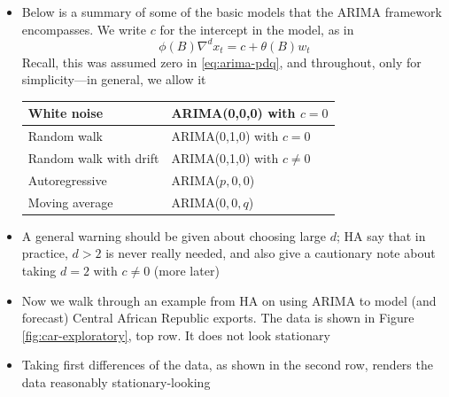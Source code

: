 \documentclass{article}
\begin{document}
\begin{itemize}
\item Below is a summary of some of the basic models that the ARIMA framework
  encompasses. We write $c$ for the intercept in the model, as in 
  \begin{equation}
  \label{eq:arima-pdq-intercept}
  \phi(B) \nabla^d x_t = c + \theta(B) w_t
  \end{equation}
  Recall, this was assumed zero in \eqref{eq:arima-pdq}, and throughout, only
  for simplicity---in general, we allow it 
  \begin{center} \smallskip
  \begin{tabular}{|l|l|}
  \hline
  White noise & ARIMA(0,0,0) with $c=0$ \\
  \hline
  Random walk & ARIMA(0,1,0) with $c=0$ \\
  \hline 
  Random walk with drift & ARIMA(0,1,0) with $c \not= 0$ \\
  \hline
  Autoregressive & ARIMA($p,0,0$) \\
  \hline
  Moving average & ARIMA($0,0,q$) \\
  \hline
  \end{tabular} \smallskip
  \end{center}

\item A general warning should be given about choosing large $d$; HA say that in
  practice, $d > 2$ is never really needed, and also give a cautionary note
  about taking $d = 2$ with $c \not= 0$ (more later)

\item Now we walk through an example from HA on using ARIMA to model (and
  forecast) Central African Republic exports. The data is shown in Figure
  \ref{fig:car-exploratory}, top row. It does not look stationary  

\item Taking first differences of the data, as shown in the second row, renders
  the data reasonably stationary-looking 


\end{itemize}
\end{document}
